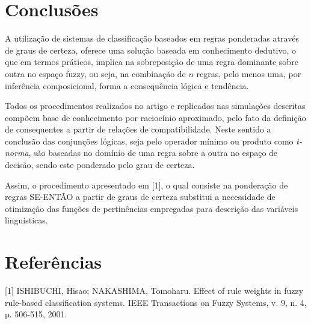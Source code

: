 \documentclass[12pt,a4paper]{article}
\numberwithin{equation}{section}
\begin{document}
\newpage
\section{Conclusões}

A utilização de sistemas de classificação baseados em regras ponderadas através de graus de certeza, oferece uma solução baseada em conhecimento dedutivo, o que em termos práticos, implica na sobreposição de uma regra dominante sobre outra no espaço fuzzy, ou seja, na combinação de $n$ regras, pelo menos uma, por inferência composicional, forma a consequência lógica e tendência.

Todos os procedimentos realizados no artigo e replicados nas simulações descritas compõem base de conhecimento por raciocínio aproximado, pelo fato da definição de consequentes a partir de relações de compatibilidade. Neste sentido a conclusão das conjunções lógicas, seja pelo operador mínimo ou produto como \textit{t-norma}, são baseadas no domínio de uma regra sobre a outra no espaço de decisão, sendo este ponderado pelo grau de certeza.

Assim, o procedimento apresentado em [1], o qual consiste na ponderação de regras SE-ENTÃO a partir de graus de certeza substitui a necessidade de otimização das funções de pertinências empregadas para descrição das variáveis linguísticas.
\newpage

\section*{Referências}
%

[1] ISHIBUCHI, Hisao; NAKASHIMA, Tomoharu. Effect of rule weights in fuzzy rule-based classification systems. IEEE Transactions on Fuzzy Systems, v. 9, n. 4, p. 506-515, 2001.
\end{document}
